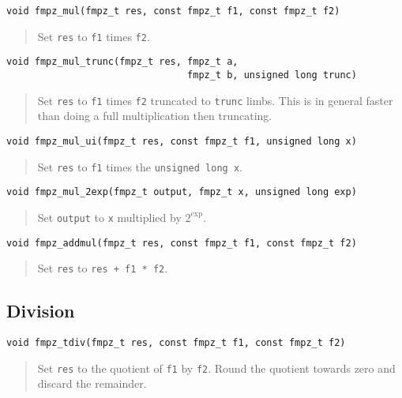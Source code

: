 \documentclass[a4paper,10pt]{article}
\newcommand{\code}{\lstinline}
\begin{document}
\begin{lstlisting}
void fmpz_mul(fmpz_t res, const fmpz_t f1, const fmpz_t f2)
\end{lstlisting}
\begin{quote}
Set \code{res} to \code{f1} times \code{f2}.
\end{quote}

\begin{lstlisting}
void fmpz_mul_trunc(fmpz_t res, fmpz_t a, 
                                fmpz_t b, unsigned long trunc) 
\end{lstlisting}
\begin{quote}
Set \code{res} to \code{f1} times \code{f2} truncated to \code{trunc} limbs. This is in general faster than doing a full multiplication then truncating.
\end{quote}

\begin{lstlisting}
void fmpz_mul_ui(fmpz_t res, const fmpz_t f1, unsigned long x)
\end{lstlisting}
\begin{quote}
Set \code{res} to \code{f1} times the \code{unsigned long x}.
\end{quote}

\begin{lstlisting}
void fmpz_mul_2exp(fmpz_t output, fmpz_t x, unsigned long exp)
\end{lstlisting}
\begin{quote}
Set \code{output} to \code{x} multiplied by $2^{\mbox{exp}}$.
\end{quote}

\begin{lstlisting}
void fmpz_addmul(fmpz_t res, const fmpz_t f1, const fmpz_t f2)
\end{lstlisting}
\begin{quote}
Set \code{res} to \code{res + f1 * f2}.
\end{quote}

\subsection{Division}

\begin{lstlisting}
void fmpz_tdiv(fmpz_t res, const fmpz_t f1, const fmpz_t f2)
\end{lstlisting}
\begin{quote}
Set \code{res} to the quotient of \code{f1} by \code{f2}. Round the quotient towards zero and discard the remainder.
\end{quote}
\end{document}
